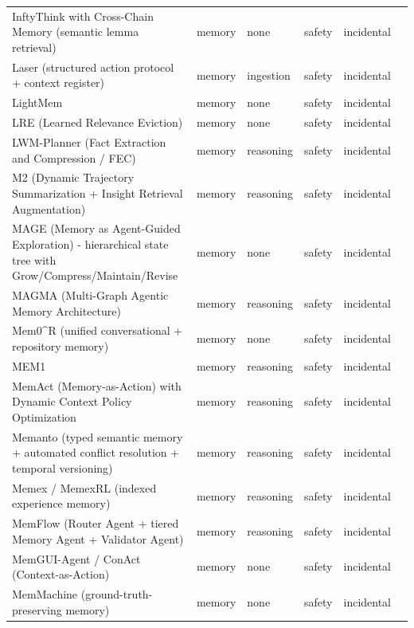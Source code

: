 \begin{longtable}{@{}>{\raggedright\arraybackslash}p{}lllll@{}}
InftyThink with Cross-Chain Memory (semantic lemma retrieval) & memory & none & safety & incidental & \cite{tekin-2025-directional} \\
Laser (structured action protocol + context register) & memory & ingestion & safety & incidental & \cite{wang-2025-laser} \\
LightMem & memory & none & safety & incidental & \cite{zhang-2026-lightweight} \\
LRE (Learned Relevance Eviction) & memory & none & safety & incidental & \cite{lia-2026-learning} \\
LWM-Planner (Fact Extraction and Compression / FEC) & memory & reasoning & safety & incidental & \cite{holt-2025-factaugmented} \\
M2 (Dynamic Trajectory Summarization + Insight Retrieval Augmentation) & memory & reasoning & safety & incidental & \cite{yan-2026-dualmemory} \\
MAGE (Memory as Agent-Guided Exploration) - hierarchical state tree with Grow/Compress/Maintain/Revise & memory & none & safety & incidental & \cite{chen-2026-semantic} \\
MAGMA (Multi-Graph Agentic Memory Architecture) & memory & reasoning & safety & incidental & \cite{jiang-2026-magma} \\
Mem0\^{}R (unified conversational + repository memory) & memory & none & safety & incidental & \cite{liu-2026-scalable} \\
MEM1 & memory & reasoning & safety & incidental & \cite{zhou-2025-mem1} \\
MemAct (Memory-as-Action) with Dynamic Context Policy Optimization & memory & reasoning & safety & incidental & \cite{zhang-2025-memory} \\
Memanto (typed semantic memory + automated conflict resolution + temporal versioning) & memory & reasoning & safety & incidental & \cite{abtahi-2026-memanto} \\
Memex / MemexRL (indexed experience memory) & memory & reasoning & safety & incidental & \cite{wang-2026-memex} \\
MemFlow (Router Agent + tiered Memory Agent + Validator Agent) & memory & reasoning & safety & incidental & \cite{chen-2026-memflow} \\
MemGUI-Agent / ConAct (Context-as-Action) & memory & none & safety & incidental & \cite{liu-2026-memguiagent} \\
MemMachine (ground-truth-preserving memory) & memory & none & safety & incidental & \cite{wang-2026-memmachine} \\

\end{longtable}
